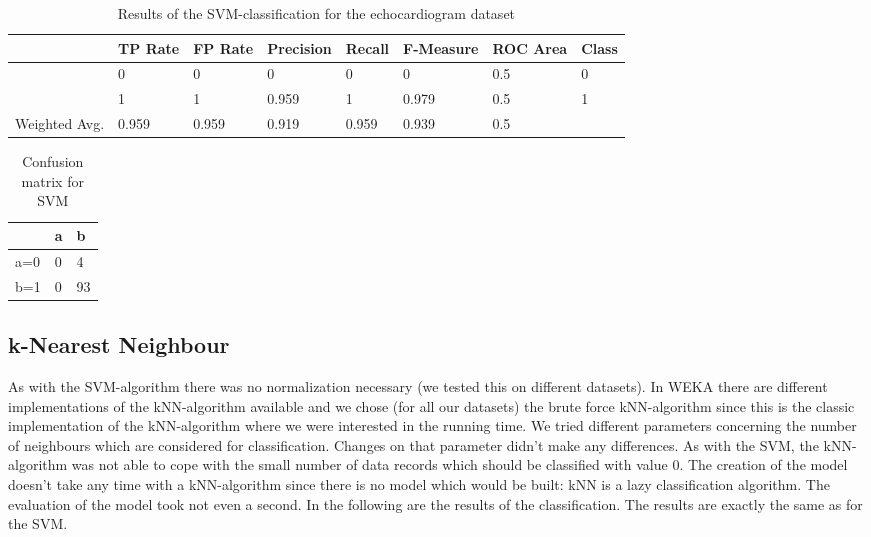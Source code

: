 \documentclass[paper=a4, fontsize=11pt]{scrartcl} %
\numberwithin{equation}{section} %
\numberwithin{figure}{section} %
\numberwithin{table}{section} %
\begin{document}
\begin{table}[h]
\centering
\begin{tabular}{|llllllll|}
	\hline
									&TP Rate   	&FP Rate   &Precision   &Recall  &F-Measure   &ROC Area  &Class\\
	\hline
									&0         	&0         &0         	&0       &  0         & 0.5      &0\\
  								&1         	&1         &0.959     	&1       &0.979       &	0.5      &1\\
  \hline
	Weighted Avg.		&0.959     	&0.959     &0.919   		&0.959   &0.939     	&0.5	&\\
	\hline
\end{tabular}
\caption{Results of the SVM-classification for the echocardiogram dataset}
\end{table}

\vspace{6pt}

\begin{table}[h]
\centering
\begin{tabular}{|l|ll|}
\hline
 & a &	b \\
\hline
a=0 & 0 & 4 \\
b=1 & 0 & 93\\
\hline
\end{tabular}
\caption{Confusion matrix for SVM}
\end{table}



\subsection{k-Nearest Neighbour}

As with the SVM-algorithm there was no normalization necessary (we tested this on different datasets). In WEKA there are different implementations of the kNN-algorithm available and we chose (for all our datasets) the brute force kNN-algorithm since this is the classic implementation of the kNN-algorithm where we were interested in the running time. We tried different parameters concerning the number of neighbours which are considered for classification. Changes on that parameter didn't make any differences. As with the SVM, the kNN-algorithm was not able to cope with the small number of data records which should be classified with value 0. The creation of the model doesn't take any time with a kNN-algorithm since there is no model which would be built: kNN is a lazy classification algorithm. The evaluation of the model took not even a second. In the following are the results of the classification. The results are exactly the same as for the SVM.
\end{document}

